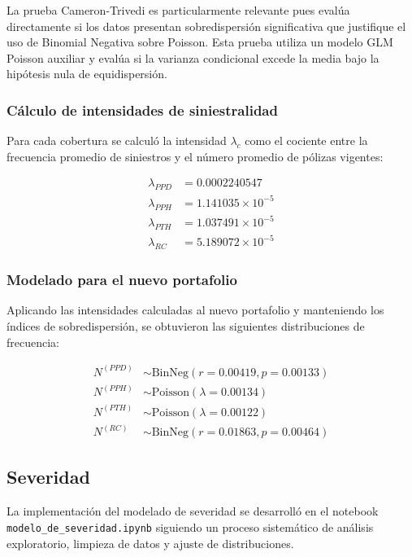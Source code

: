 La prueba Cameron-Trivedi es particularmente relevante pues evalúa directamente si los datos presentan sobredispersión significativa que justifique el uso de Binomial Negativa sobre Poisson. Esta prueba utiliza un modelo GLM Poisson auxiliar y evalúa si la varianza condicional excede la media bajo la hipótesis nula de equidispersión.

\subsubsection{Cálculo de intensidades de siniestralidad}

Para cada cobertura se calculó la intensidad $\lambda_c$ como el cociente entre la frecuencia promedio de siniestros y el número promedio de pólizas vigentes:

\begin{align}
\lambda_{PPD} &= 0.0002240547\\
\lambda_{PPH} &= 1.141035 \times 10^{-5}\\
\lambda_{PTH} &= 1.037491 \times 10^{-5}\\
\lambda_{RC} &= 5.189072 \times 10^{-5}
\end{align}

\subsubsection{Modelado para el nuevo portafolio}

Aplicando las intensidades calculadas al nuevo portafolio y manteniendo los índices de sobredispersión, se obtuvieron las siguientes distribuciones de frecuencia:

\begin{align}
N^{(PPD)} &\sim \text{BinNeg}(r = 0.00419, p = 0.00133)\\
N^{(PPH)} &\sim \text{Poisson}(\lambda = 0.00134)\\
N^{(PTH)} &\sim \text{Poisson}(\lambda = 0.00122)\\
N^{(RC)} &\sim \text{BinNeg}(r = 0.01863, p = 0.00464)
\end{align}

\subsection{Severidad}

La implementación del modelado de severidad se desarrolló en el notebook \texttt{modelo\_de\_severidad.ipynb} siguiendo un proceso sistemático de análisis exploratorio, limpieza de datos y ajuste de distribuciones.

